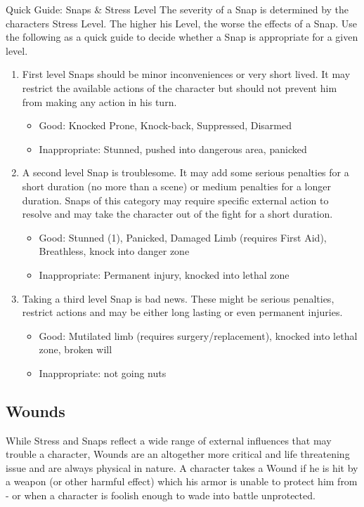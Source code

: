 \begin{DndSidebar}{Quick Guide: Snaps \& Stress Level}
The severity of a Snap is determined by the characters Stress Level.
The higher his Level, the worse the effects of a Snap.
Use the following as a quick guide to decide whether a Snap is appropriate for a given level.
\begin{enumerate}
	\item First level Snaps should be minor inconveniences or very short lived. It may restrict the available actions of the character but should not prevent him from making any action in his turn.
	\begin{itemize}
		\item Good: Knocked Prone, Knock-back, Suppressed, Disarmed
		\item Inappropriate: Stunned, pushed into dangerous area, panicked
	\end{itemize}
	\item A second level Snap is troublesome. It may add some serious penalties for a short duration (no more than a scene) or medium penalties for a longer duration. Snaps of this category may require specific external action to resolve and may take the character out of the fight for a short duration.
	\begin{itemize}
		\item Good: Stunned (1), Panicked, Damaged Limb (requires First Aid), Breathless, knock into danger zone
		\item Inappropriate: Permanent injury, knocked into lethal zone
	\end{itemize}
	\item Taking a third level Snap is bad news. These might be serious penalties, restrict actions and may be either long lasting or even permanent injuries.
	\begin{itemize}
		\item Good: Mutilated limb (requires surgery/replacement), knocked into lethal zone, broken will
		\item Inappropriate: not going nuts
	\end{itemize}
\end{enumerate}
\end{DndSidebar}

\subsection*{Wounds}\label{wounds}
While Stress and Snaps reflect a wide range of external influences that may trouble a character, Wounds are an altogether more critical and life threatening issue and are always physical in nature.
A character takes a Wound if he is hit by a weapon (or other harmful effect) which his armor is unable to protect him from - or when a character is foolish enough to wade into battle unprotected.

